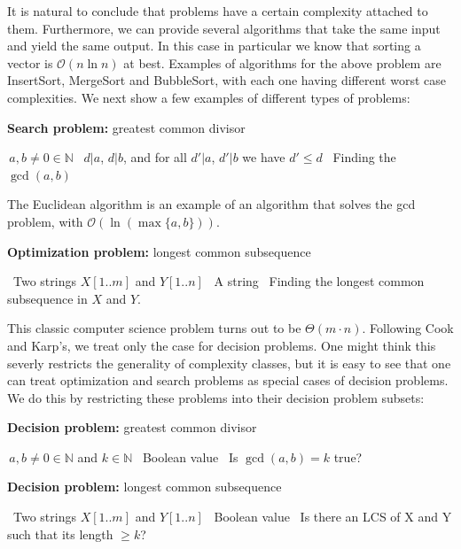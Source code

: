 \documentclass{amsart}
\theoremstyle{plain}
\numberwithin{equation}{section}
\newcommand{\bigo}{\mathcal{O}}
\begin{document}
It is natural to conclude that problems have a certain complexity attached to them. Furthermore, we
can provide several algorithms that take the same input and yield the same output. In this case in
particular we know that sorting a vector is $\bigo(n\ln n)$ at best. Examples of algorithms for the
above problem are InsertSort, MergeSort and BubbleSort, with each one having different worst case
complexities. We next show a few examples of different types of problems:

\begin{algorithm}[h]
  \caption*{\textbf{Search problem:} greatest common divisor}
  \begin{algorithmic}[1]
    \Require\,$a, b\neq 0\in\mathbb{N}$
    \Ensure\, $d|a$, $d|b$, and for all $d'|a$, $d'|b$ we have $d'\leq d$
    \Statex\, Finding the $\gcd(a, b)$
  \end{algorithmic}
\end{algorithm}

The Euclidean algorithm is an example of an algorithm that solves the gcd problem, with
$\bigo(\ln(\max\{a,b\}))$.

\begin{algorithm}[h]
  \caption*{\textbf{Optimization problem:} longest common subsequence}
  \begin{algorithmic}[1]
    \Require\, Two strings $X[1..m]$ and $Y[1..n]$
    \Ensure\, A string
    \Statex\, Finding the longest common subsequence in $X$ and $Y$.
  \end{algorithmic}
\end{algorithm}

This classic computer science problem turns out to be $\Theta(m\cdot n)$. Following Cook and
Karp's, we treat only the case for decision problems. One might think this severly restricts the
generality of complexity classes, but it is easy to see that one can treat optimization and search
problems as special cases of decision problems. We do this by restricting these problems into their
decision problem subsets:

\begin{algorithm}[h]
  \caption*{\textbf{Decision problem:} greatest common divisor}
  \begin{algorithmic}[1]
    \Require\,$a, b\neq 0\in\mathbb{N}$ and $k\in\mathbb{N}$
    \Ensure\, Boolean value
    \Statex\, Is $\gcd(a, b)=k$ true?
  \end{algorithmic}
\end{algorithm}

\begin{algorithm}[h]
  \caption*{\textbf{Decision problem:} longest common subsequence}
  \begin{algorithmic}[1]
    \Require\, Two strings $X[1..m]$ and $Y[1..n]$
    \Ensure\, Boolean value
    \Statex\, Is there an LCS of X and Y such that its length $\geq k$?
  \end{algorithmic}
\end{algorithm}
\end{document}

